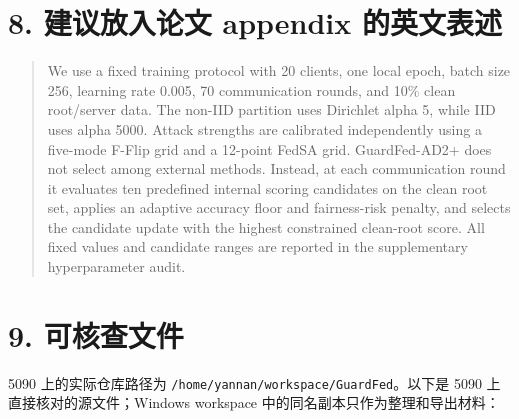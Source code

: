\documentclass[UTF8,a4paper,10pt]{ctexart}
\begin{document}
\section{8. 建议放入论文 appendix 的英文表述}
\begin{quote}
We use a fixed training protocol with 20 clients, one local epoch, batch size 256, learning rate 0.005, 70 communication rounds, and 10\%  clean root/server data. The non-IID partition uses Dirichlet alpha 5, while IID uses alpha 5000. Attack strengths are calibrated independently using a five-mode F-Flip grid and a 12-point FedSA grid. GuardFed-AD2+ does not select among external methods. Instead, at each communication round it evaluates ten predefined internal scoring candidates on the clean root set, applies an adaptive accuracy floor and fairness-risk penalty, and selects the candidate update with the highest constrained clean-root score. All fixed values and candidate ranges are reported in the supplementary hyperparameter audit.\\
\end{quote}
\section{9. 可核查文件}
5090 上的实际仓库路径为 \texttt{/home/yannan/workspace/GuardFed}。以下是 5090 上直接核对的源文件；Windows workspace 中的同名副本只作为整理和导出材料：
\end{document}
